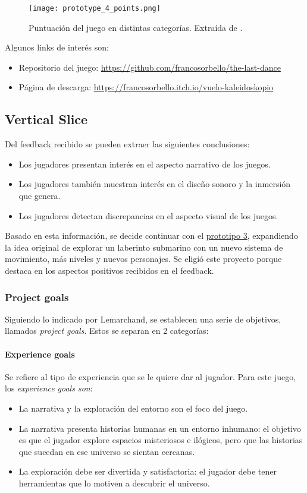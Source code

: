 \begin{figure}[H]
  \centering
  \texttt{[image: prototype\_4\_points.png]}
  \caption{Puntuación del juego en distintas categorías. Extraída de \cite{VueloKaleidoskopioFranco}.}
  \label{fig:x prototipo 4 puntuacion}
\end{figure}
Algunos links de interés son:
\begin{itemize}
  \item Repositorio del juego: \url{https://github.com/francosorbello/the-last-dance}
  \item Página de descarga: \url{https://francosorbello.itch.io/vuelo-kaleidoskopio}
\end{itemize}
%
%
\subsection{Vertical Slice}
\par Del feedback recibido se pueden extraer las siguientes conclusiones:
\begin{itemize}
  \item Los jugadores presentan interés en el aspecto narrativo de los juegos.
  \item Los jugadores también muestran interés en el diseño sonoro y la inmersión que genera.
  \item Los jugadores detectan discrepancias en el aspecto visual de los juegos. 
\end{itemize}
\par Basado en esta información, se decide continuar con el \hyperref[sec:prototype_3]{prototipo 3}, expandiendo la idea original de explorar un laberinto submarino con un nuevo sistema de movimiento, más niveles y nuevos personajes. Se eligió este proyecto porque destaca en los aspectos positivos recibidos en el feedback.  %
\subsubsection{Project goals}
\par Siguiendo lo indicado por Lemarchand, se establecen una serie de objetivos, llamados \textit{project goals}. Estos se separan en 2 categorías:
\paragraph{Experience goals} Se refiere al tipo de experiencia que se le quiere dar al jugador. Para este juego, los \textit{experience goals son}:
\begin{itemize}
  \item La narrativa y la exploración del entorno son el foco del juego.
  \item La narrativa presenta historias humanas en un entorno inhumano: el objetivo es que el jugador explore espacios misteriosos e ilógicos, pero que las historias que sucedan en ese universo se sientan cercanas.
  \item La exploración debe ser divertida y satisfactoria: el jugador debe tener herramientas que lo motiven a descubrir el universo.
\end{itemize}
